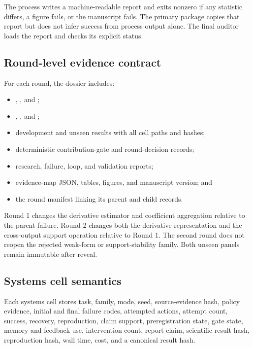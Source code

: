 The process writes a machine-readable report and exits nonzero if any
statistic differs, a figure fails, or the manuscript fails. The primary
package copies that report but does not infer success from process output
alone. The final auditor loads the report and checks its explicit status.

\subsection{Round-level evidence contract}

For each \routea{} round, the dossier includes:

\begin{itemize}
  \item {}, , and
  ;
  \item {}, , and
  ;
  \item development and unseen results with all cell paths and hashes;
  \item deterministic contribution-gate and round-decision records;
  \item research, failure, loop, and validation reports;
  \item evidence-map JSON, tables, figures, and manuscript version; and
  \item the round manifest linking its parent and child records.
\end{itemize}

Round 1 changes the derivative estimator and coefficient aggregation relative
to the parent failure. Round 2 changes both the derivative representation and
the cross-output support operation relative to Round 1. The second round does
not reopen the rejected weak-form or support-stability family. Both unseen
panels remain immutable after reveal.

\subsection{Systems cell semantics}

Each systems cell stores task, family, mode, seed, source-evidence hash, policy
evidence, initial and final failure codes, attempted actions, attempt count,
success, recovery, reproduction, claim support, preregistration state, gate
state, memory and feedback use, intervention count, report claim, scientific
result hash, reproduction hash, wall time, cost, and a canonical result hash.

